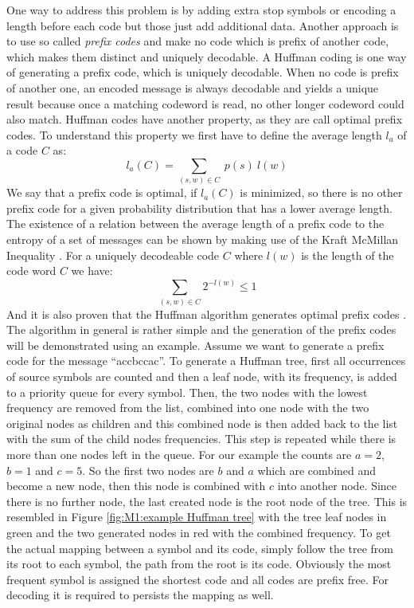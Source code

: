 \par{
One way to address this problem is by adding extra stop symbols or encoding a length before each code but those just add additional data. Another approach is to use so called \emph{prefix codes} and make no code which is prefix of another code, which makes them distinct and uniquely decodable. A Huffman coding is one way of generating a prefix code, which is uniquely decodable. When no code is prefix of another one, an encoded message is always decodable and yields a unique result because once a matching codeword is read, no other longer codeword could also match. Huffman codes have another property, as they are call optimal prefix codes. To understand this property we first have to define the average length $l_a$ of a code $C$ as:
\[
l_a(C) = \sum_{(s,w)\in C} \: p(s) \: l(w)
\]
We say that a prefix code is optimal, if $l_a(C)$ is minimized, so there is no other prefix code for a given probability distribution that has a lower average length. The existence of a relation between the average length of a prefix code to the entropy of a set of messages can be shown by making use of the Kraft McMillan Inequality \cite{mcKillan}. For a uniquely decodeable code $C$ where $l(w)$ is the length of the code word $C$ we have:
\[
\sum_{(s,w)\in C} 2^{-l(w)} \leq 1
\]
And it is also proven that the Huffman algorithm generates optimal prefix codes \cite{compressionIntroduction}. The algorithm	 in general is rather simple and the generation of the prefix codes will be demonstrated using an example. Assume we want to generate a prefix code for the message \enquote{accbccac}. To generate a Huffman tree, first all occurrences of source symbols are counted and then a leaf node, with its frequency, is added to a priority queue for every symbol. Then, the two nodes with the lowest frequency are removed from the list, combined into one node with the two original nodes as children and this combined node is then added back to the list with the sum of the child nodes frequencies. This step is repeated while there is more than one nodes left in the queue. For our example the counts are $a = 2$, $b = 1$ and $c = 5$. So the first two nodes are $b$ and $a$ which are combined and become a new node, then this node is combined with $c$ into another node. Since there is no further node, the last created node is the root node of the tree. This is resembled in Figure \ref{fig:M1:example Huffman tree} with the tree leaf nodes in green and the two generated nodes in red with the combined frequency. To get the actual mapping between a symbol and its code, simply follow the tree from its root to each symbol, the path from the root is its code. Obviously the most frequent symbol is assigned the shortest code and all codes are prefix free. For decoding it is required to persists the mapping as well.

}
